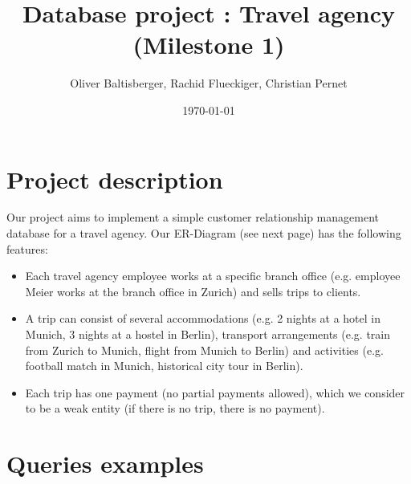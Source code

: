 \documentclass{article}
\title{Database project : Travel agency \\ (Milestone 1)}
\author{Oliver Baltisberger, Rachid Flueckiger, Christian Pernet}
\date{\today}
\begin{document}
	\maketitle
	
	\section*{Project description}
	Our project aims to implement a simple customer relationship management database
	for a travel agency. Our ER-Diagram (see next page) has the following features:
	\begin{itemize}
		\item Each travel agency employee works at a specific branch office (e.g. employee Meier works at the branch office in Zurich) and sells trips to clients.
 		\item A trip can consist of several accommodations (e.g. 2 nights at a hotel in Munich, 3 nights at a hostel in Berlin), transport arrangements (e.g. train from Zurich to Munich, flight from Munich to Berlin) and activities (e.g. football match in Munich, historical city tour in Berlin).
		\item Each trip has one payment (no partial payments allowed), which we consider to be a weak entity (if there is no trip, there is no payment).
	\end{itemize}
	
	\section*{Queries examples}
			
\end{document}
